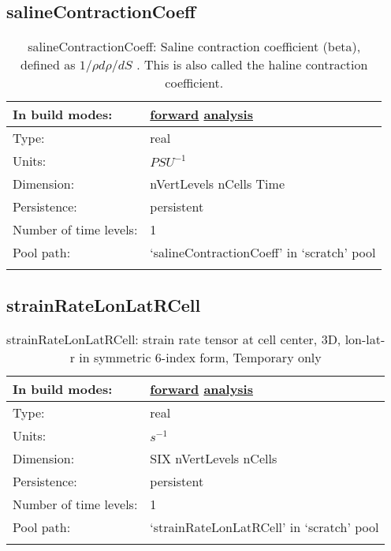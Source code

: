 \subsection[salineContractionCoeff]{salineContractionCoeff}
\label{subsec:var_sec_scratch_salineContractionCoeff}
\begin{center}
\begin{longtable}{| p{2.0in} | p{4.0in} |}
        \hline 
        In build modes: & \hyperref[subsec:forward_var_tab_scratch]{forward} \hyperref[subsec:analysis_var_tab_scratch]{analysis} \\
        \hline 
        Type: & real \\
        \hline 
        Units: & $PSU^{-1}$ \\
        \hline 
        Dimension: & nVertLevels nCells Time \\
        \hline 
        Persistence: & persistent \\
        \hline 
        Number of time levels: & 1 \\
        \hline 
            Pool path: & `salineContractionCoeff' in `scratch' pool \\
		 \hline 
    \caption{salineContractionCoeff:  Saline contraction coefficient (beta), defined as  $1/\rho d\rho/dS$ . This is also called the haline contraction coefficient.}
\end{longtable}
\end{center}
\subsection[strainRateLonLatRCell]{strainRateLonLatRCell}
\label{subsec:var_sec_scratch_strainRateLonLatRCell}
\begin{center}
\begin{longtable}{| p{2.0in} | p{4.0in} |}
        \hline 
        In build modes: & \hyperref[subsec:forward_var_tab_scratch]{forward} \hyperref[subsec:analysis_var_tab_scratch]{analysis} \\
        \hline 
        Type: & real \\
        \hline 
        Units: & $s^{-1}$ \\
        \hline 
        Dimension: & SIX nVertLevels nCells \\
        \hline 
        Persistence: & persistent \\
        \hline 
        Number of time levels: & 1 \\
        \hline 
            Pool path: & `strainRateLonLatRCell' in `scratch' pool \\
		 \hline 
    \caption{strainRateLonLatRCell: strain rate tensor at cell center, 3D, lon-lat-r in symmetric 6-index form, {\color{red}Temporary only}}
\end{longtable}
\end{center}
